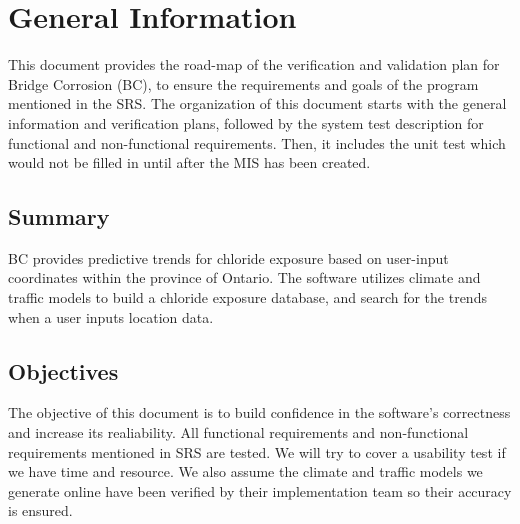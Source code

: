\documentclass[12pt, titlepage]{article}
\begin{document}


\newpage


\section{General Information}

This document provides the road-map of the verification and validation plan for Bridge Corrosion (BC), to ensure the requirements and goals of the program mentioned in the SRS. The organization of this document starts with the general information and verification plans, followed by the system test description for functional and non-functional requirements. Then, it includes the unit test which would not be filled in until after the MIS has been created.

\subsection{Summary}

BC provides predictive trends for chloride exposure based on user-input coordinates within the province of Ontario. The software utilizes climate and traffic models to build a chloride exposure database, and search for the trends when a user inputs location data.

\subsection{Objectives}
The objective of this document is to build confidence in the software's correctness and increase its realiability. All functional requirements and non-functional requirements mentioned in SRS are tested. We will try to cover a usability test if we have time and resource. We also assume the climate and traffic models we generate online have been verified by their implementation team so their accuracy is ensured. 


\end{document}
